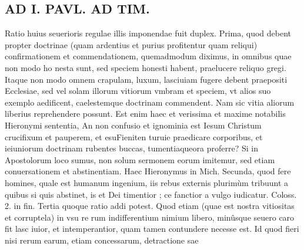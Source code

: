 \documentclass{article}
\begin{document}
\begin{pages}
\section*{AD I. PAVL. AD TIM. }
\marginpar{[ p.372 ]}\pstart Ratio huius seuerioris regulae illis imponendae fuit duplex.  \pend\pstart Prima, quod debent propter doctrinae (quam ardentius et purius profitentur quam reliqui) confirmationem et commendationem, quemadmodum diximus, in omnibus quae non modo ho nesta sunt, sed speciem honesti habent, praelucere reliquo gregi. Itaque non modo omnem crapulam, luxum, lasciuiam fugere debent praepositi Ecclesiae, sed vel solam illorum vitiorum vmbram et speciem, vt alios suo exemplo aedificent, caelestemque doctrinam commendent. Nam sic vitia aliorum liberius reprehendere possunt. Est enim haec et verissima et maxime notabilis Hieronymi sententia, An non confusio et ignominia est Iesum Christum crucifixum et pauperem, et esuFieniten turuie praedicare corporibus, et ieiuniorum doctrinam rubentes buccas, tumentiaqueora proferre? Si in Apostolorum loco sumus, non solum sermonem eorum imitemur, sed etiam conuersationem et abstinentiam. Haec Hieronymus in Mich.  \pend\pstart Secunda, quod fere homines, quale est humanum ingenium, iis rebus externis plurimùm tribuunt a quibus si quis abstinet, is et Dei timentior ; ce fanctior a vulgo iudicatur. Coloss. 2. in fin.  \pend\pstart Tertia quoque ratio addi potest. Quod etiam (quae est nostra vitiositas et corruptela) in vsu re rum indifferentium nimium libero, minûsque seuero caro fit lasc iuior, et intemperantior, quam tamen contundere necesse est. Id quod fieri nisi rerum earum, etiam concessarum, detractione sae  \pend

\end{pages}
\end{document}
